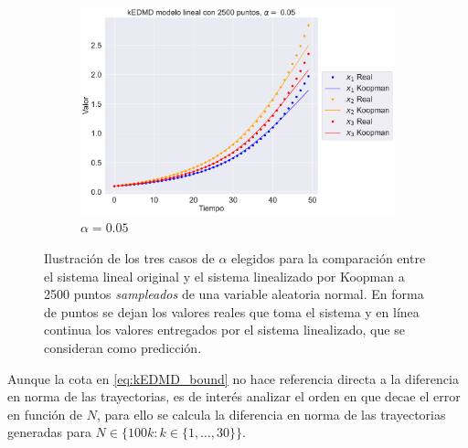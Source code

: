 \begin{figure}[htbp]
\begin{subfigure}[b]{0.32\textwidth}
        \includegraphics[width=\textwidth]{img/content/chapter3/Linear3.pdf}
        \caption{$\alpha=0.05$}
    \end{subfigure}
    \caption{Ilustración de los tres casos de $\alpha$ elegidos para la comparación entre el sistema lineal original y el sistema linealizado por Koopman a 2500 puntos \textit{sampleados} de una variable aleatoria normal. En forma de puntos se dejan los valores reales que toma el sistema y en línea continua los valores entregados por el sistema linealizado, que se consideran como predicción.}
    \label{fig:Comp_traj_lin}
\end{figure}
Aunque la cota en \eqref{eq:kEDMD_bound} no hace referencia directa a la diferencia en norma de las trayectorias, es de interés analizar el orden en que decae el error en función de $N$, para ello se calcula la diferencia en norma de las trayectorias generadas para $N \in \{ 100k : k \in \{1, \dots, 30\} \}$. 


